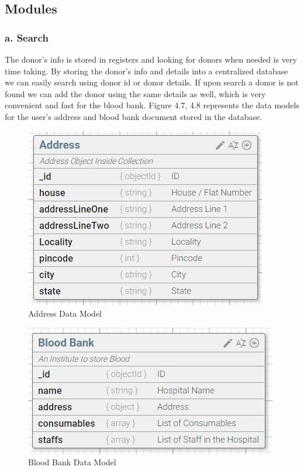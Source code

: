 \documentclass[BTech]{srmuthesis}
\begin{document}
\subsection{Modules}
\subsubsection{a. Search}
The donor's info is stored in registers and looking for donors when needed is very time taking. By storing the donor's info and details into a centralized database we can easily search using donor id or donor details. If upon search a donor is not found we can add the donor using the same details as well, which is very convenient and fast for the blood bank. Figure 4.7, 4.8 represents the data models for the user's address and blood bank document stored in the database.
\begin{figure}[H]
	\centering
	\includegraphics[scale=0.6]{search_address.jpeg}
	\caption{Address Data Model}
\end{figure}
\begin{figure}[H]
	\centering
	\includegraphics[scale=0.6]{search_blood_bank.jpeg}
	\caption{Blood Bank Data Model}
\end{figure}
\end{document}
